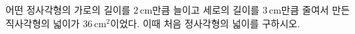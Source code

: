 어떤 정사각형의 가로의 길이를 $2\,\mathrm{cm}$만큼 늘이고 세로의 길이를 $3\,\mathrm{cm}$만큼 줄여서 만든 직사각형의 넓이가 $36\,\mathrm{cm}^2$이었다. 이때 처음 정사각형의 넓이를 구하시오.

